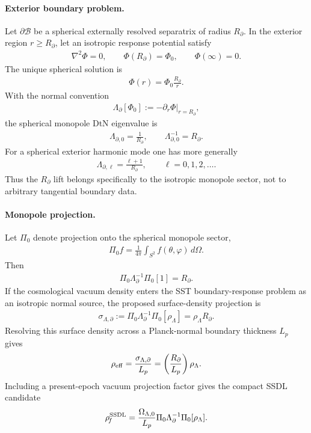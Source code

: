 \paragraph{Exterior boundary problem.}
Let \(\partial\mathcal B\) be a spherical externally resolved separatrix
of radius \(R_\partial\).  In the exterior region \(r\ge R_\partial\), let
an isotropic response potential satisfy
\begin{align}
    \nabla^2\Phi=0,
    \qquad
    \Phi(R_\partial)=\Phi_0,
    \qquad
    \Phi(\infty)=0 .
\end{align}
The unique spherical solution is
\begin{align}
    \Phi(r)=\Phi_0\frac{R_\partial}{r} .
\end{align}
With the normal convention
\begin{align}
    \Lambda_\partial[\Phi_0]
    :=
    -\partial_r\Phi\big|_{r=R_\partial},
\end{align}
the spherical monopole DtN eigenvalue is
\begin{align}
    \Lambda_{\partial,0}
    =
    \frac{1}{R_\partial},
    \qquad
    \Lambda_{\partial,0}^{-1}
    =
    R_\partial .
\end{align}
For a spherical exterior harmonic mode one has more generally
\begin{align}
    \Lambda_{\partial,\ell}
    =
    \frac{\ell+1}{R_\partial},
    \qquad
    \ell=0,1,2,\ldots .
\end{align}
Thus the \(R_\partial\) lift belongs specifically to the isotropic
monopole sector, not to arbitrary tangential boundary data.

\paragraph{Monopole projection.}
Let \(\Pi_0\) denote projection onto the spherical monopole sector,
\begin{align}
    \Pi_0 f
    =
    \frac{1}{4\pi}
    \int_{S^2} f(\theta,\varphi)\,d\Omega .
\end{align}
Then
\begin{align}
    \Pi_0\Lambda_\partial^{-1}\Pi_0[1]
    =
    R_\partial .
\end{align}
If the cosmological vacuum density enters the SST boundary-response
problem as an isotropic normal source, the proposed surface-density
projection is
\begin{align}
    \sigma_{\Lambda,\partial}
    :=
    \Pi_0\Lambda_\partial^{-1}\Pi_0[\rho_\Lambda]
    =
    \rho_\Lambda R_\partial .
\end{align}
Resolving this surface density across a Planck-normal boundary thickness
\(L_p\) gives
\begin{align}
    \rho_{\rm eff}
    =
    \frac{\sigma_{\Lambda,\partial}}{L_p}
    =
    \left(\frac{R_\partial}{L_p}\right)\rho_\Lambda .
\end{align}
Including a present-epoch vacuum projection factor gives the compact
SSDL candidate
\begin{align}
    \rho_{\!f}^{\rm SSDL}
    =
    \frac{\Omega_{\Lambda,0}}{L_p}
    \Pi_0\Lambda_\partial^{-1}\Pi_0[\rho_\Lambda] .
    \label{eq:rt_ssdl_operator_form}
\end{align}

